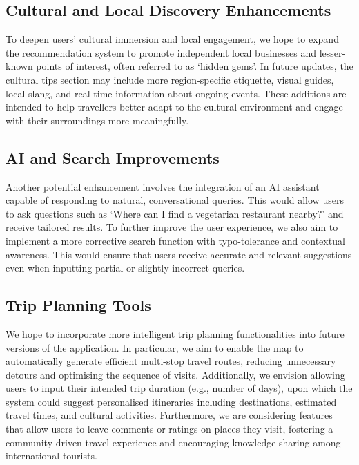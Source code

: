 \subsection{Cultural and Local Discovery Enhancements}
To deepen users’ cultural immersion and local engagement, we hope to expand the recommendation system to promote independent local businesses and lesser-known points of interest, often referred to as ‘hidden gems’. In future updates, the cultural tips section may include more region-specific etiquette, visual guides, local slang, and real-time information about ongoing events. These additions are intended to help travellers better adapt to the cultural environment and engage with their surroundings more meaningfully.

\subsection{AI and Search Improvements}
Another potential enhancement involves the integration of an AI assistant capable of responding to natural, conversational queries. This would allow users to ask questions such as ‘Where can I find a vegetarian restaurant nearby?’ and receive tailored results. To further improve the user experience, we also aim to implement a more corrective search function with typo-tolerance and contextual awareness. This would ensure that users receive accurate and relevant suggestions even when inputting partial or slightly incorrect queries.

\subsection{Trip Planning Tools}
We hope to incorporate more intelligent trip planning functionalities into future versions of the application. In particular, we aim to enable the map to automatically generate efficient multi-stop travel routes, reducing unnecessary detours and optimising the sequence of visits. Additionally, we envision allowing users to input their intended trip duration (e.g., number of days), upon which the system could suggest personalised itineraries including destinations, estimated travel times, and cultural activities. Furthermore, we are considering features that allow users to leave comments or ratings on places they visit, fostering a community-driven travel experience and encouraging knowledge-sharing among international tourists.

